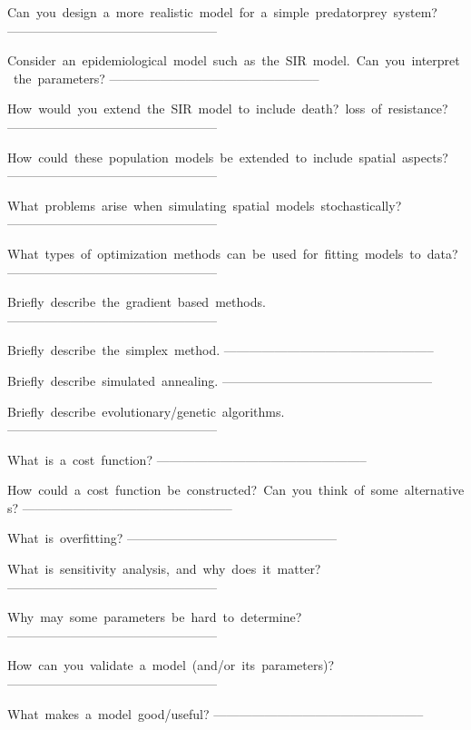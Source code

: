 Can you design a more realistic model for a simple predator­prey system?
--------------------------------------------------

Consider an epidemiological model such as the SIR model. Can you interpret the parameters?
--------------------------------------------------

How would you extend the SIR model to include death? loss of resistance?
--------------------------------------------------

How could these population models be extended to include spatial aspects?
--------------------------------------------------

What problems arise when simulating spatial models stochastically?
--------------------------------------------------

What types of optimization methods can be used for fitting models to data?
--------------------------------------------------

Briefly describe the gradient based methods.
--------------------------------------------------

Briefly describe the simplex method.
--------------------------------------------------

Briefly describe simulated annealing.
--------------------------------------------------

Briefly describe evolutionary/genetic algorithms.
--------------------------------------------------

What is a cost function?
--------------------------------------------------

How could a cost function be constructed? Can you think of some alternatives?
--------------------------------------------------

What is overfitting?
--------------------------------------------------

What is sensitivity analysis, and why does it matter?
--------------------------------------------------

Why may some parameters be hard to determine?
--------------------------------------------------

How can you validate a model (and/or its parameters)?
--------------------------------------------------

What makes a model good/useful?
--------------------------------------------------
